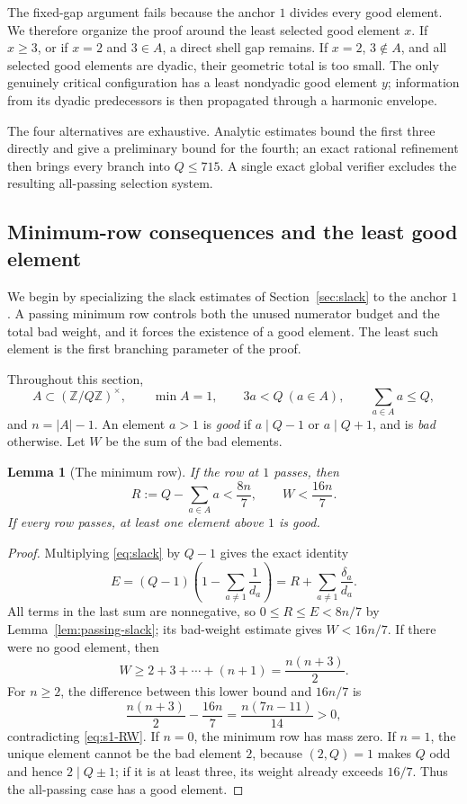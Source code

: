 \documentclass[11pt]{article}
\newtheorem{lemma}[theorem]{Lemma}
\theoremstyle{definition}
\theoremstyle{remark}
\newcommand{\U}{(\mathbb Z/Q\mathbb Z)^\times}
\begin{document}
The fixed-gap argument fails because the anchor \(1\) divides every good
element.  We therefore organize the proof around the least selected good
element \(x\).  If \(x\ge3\), or if \(x=2\) and \(3\in A\), a direct shell
gap remains.  If \(x=2\), \(3\notin A\), and all selected good elements are
dyadic, their geometric total is too small.  The only genuinely critical
configuration has a least nondyadic good element \(y\); information from its
dyadic predecessors is then propagated through a harmonic envelope.

The four alternatives are exhaustive.  Analytic estimates bound the first
three directly and give a preliminary bound for the fourth; an exact rational
refinement then brings every branch into \(Q\le715\).  A single exact global
verifier excludes the resulting all-passing selection system.

\subsection{Minimum-row consequences and the least good element}

We begin by specializing the slack estimates of
Section~\ref{sec:slack} to the anchor \(1\).  A passing minimum row controls
both the unused numerator budget and the total bad weight, and it forces the
existence of a good element.  The least such element is the first branching
parameter of the proof.

Throughout this section,
\[
 A\subset\U,\qquad \min A=1,\qquad
 3a<Q\ (a\in A),\qquad \sum_{a\in A}a\le Q,
\]
and \(n=|A|-1\).  An element \(a>1\) is \emph{good} if
\(a\mid Q-1\) or \(a\mid Q+1\), and is \emph{bad} otherwise.  Let
\(W\) be the sum of the bad elements.

\begin{lemma}[The minimum row]\label{lem:s1-minimum-row}
If the row at \(1\) passes, then
\begin{equation}\label{eq:s1-RW}
 R:=Q-\sum_{a\in A}a<\frac{8n}{7},
 \qquad W<\frac{16n}{7}.
\end{equation}
If every row passes, at least one element above \(1\) is good.
\end{lemma}

\begin{proof}
Multiplying \eqref{eq:slack} by \(Q-1\) gives the exact identity
\[
 E=(Q-1)\left(1-\sum_{a\ne1}\frac1{d_a}\right)
   =R+\sum_{a\ne1}\frac{\delta_a}{d_a}.
\]
All terms in the last sum are nonnegative, so
\(0\le R\le E<8n/7\) by Lemma~\ref{lem:passing-slack}; its bad-weight
estimate gives \(W<16n/7\).
If there were no good element, then
\[
 W\ge2+3+\cdots+(n+1)=\frac{n(n+3)}2.
\]
For \(n\ge2\), the difference between this lower bound and \(16n/7\) is
\[
 \frac{n(n+3)}2-\frac{16n}{7}
 =\frac{n(7n-11)}{14}>0,
\]
contradicting \eqref{eq:s1-RW}.  If \(n=0\), the
minimum row has mass zero.  If \(n=1\), the unique element cannot be the
bad element \(2\), because \((2,Q)=1\) makes \(Q\) odd and hence
\(2\mid Q\pm1\); if it is at least three, its weight already exceeds
\(16/7\).  Thus the all-passing case has a good element.
\end{proof}
\end{document}
